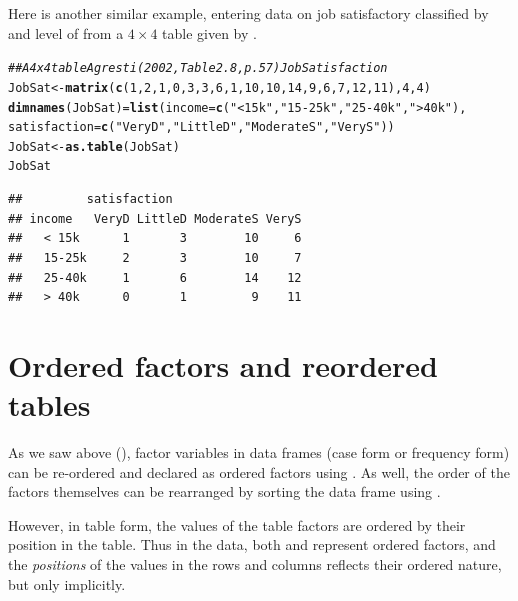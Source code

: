 \documentclass[11pt]{book}\usepackage[]{graphicx}\usepackage[]{color}
\makeatletter
\newcommand{\hlnum}[1]{\textcolor[rgb]{0.686,0.059,0.569}{#1}}%
\newcommand{\hlstr}[1]{\textcolor[rgb]{0.192,0.494,0.8}{#1}}%
\newcommand{\hlcom}[1]{\textcolor[rgb]{0.678,0.584,0.686}{\textit{#1}}}%
\newcommand{\hlstd}[1]{\textcolor[rgb]{0.345,0.345,0.345}{#1}}%
\newcommand{\hlkwb}[1]{\textcolor[rgb]{0.69,0.353,0.396}{#1}}%
\newcommand{\hlkwc}[1]{\textcolor[rgb]{0.333,0.667,0.333}{#1}}%
\newcommand{\hlkwd}[1]{\textcolor[rgb]{0.737,0.353,0.396}{\textbf{#1}}}%
\newenvironment{kframe}{%
 \def\at@end@of@kframe{}%
 \ifinner\ifhmode%
  \def\at@end@of@kframe{\end{minipage}}%
  \begin{minipage}{\columnwidth}%
 \fi\fi%
 \def\FrameCommand##1{\hskip\@totalleftmargin \hskip-\fboxsep
 \colorbox{shadecolor}{##1}\hskip-\fboxsep
     \hskip-\linewidth \hskip-\@totalleftmargin \hskip\columnwidth}%
 \MakeFramed {\advance\hsize-\width
   \@totalleftmargin\z@ \linewidth\hsize
   \@setminipage}}%
 {\par\unskip\endMakeFramed%
 \at@end@of@kframe}
\newenvironment{knitrout}{}{} %
\renewenvironment{knitrout}{\small\renewcommand{\baselinestretch}{.85}}{} %
\makeatother
\begin{document}
Here is another similar example, entering data on job satisfactory
classified by  and level of 
from a $4 \times 4$ table given by \citet[Table 2.8, p. 57]{Agresti:2002}.
\begin{knitrout}
\color{fgcolor}\begin{kframe}
\begin{alltt}
\hlcom{## A 4 x 4 table  Agresti (2002, Table 2.8, p. 57) Job Satisfaction}
\hlstd{JobSat} \hlkwb{<-} \hlkwd{matrix}\hlstd{(}\hlkwd{c}\hlstd{(}\hlnum{1}\hlstd{,}\hlnum{2}\hlstd{,}\hlnum{1}\hlstd{,}\hlnum{0}\hlstd{,} \hlnum{3}\hlstd{,}\hlnum{3}\hlstd{,}\hlnum{6}\hlstd{,}\hlnum{1}\hlstd{,} \hlnum{10}\hlstd{,}\hlnum{10}\hlstd{,}\hlnum{14}\hlstd{,}\hlnum{9}\hlstd{,} \hlnum{6}\hlstd{,}\hlnum{7}\hlstd{,}\hlnum{12}\hlstd{,}\hlnum{11}\hlstd{),} \hlnum{4}\hlstd{,} \hlnum{4}\hlstd{)}
\hlkwd{dimnames}\hlstd{(JobSat)} \hlkwb{=} \hlkwd{list}\hlstd{(}\hlkwc{income}\hlstd{=}\hlkwd{c}\hlstd{(}\hlstr{"< 15k"}\hlstd{,} \hlstr{"15-25k"}\hlstd{,} \hlstr{"25-40k"}\hlstd{,} \hlstr{"> 40k"}\hlstd{),}
                \hlkwc{satisfaction}\hlstd{=}\hlkwd{c}\hlstd{(}\hlstr{"VeryD"}\hlstd{,} \hlstr{"LittleD"}\hlstd{,} \hlstr{"ModerateS"}\hlstd{,} \hlstr{"VeryS"}\hlstd{))}
\hlstd{JobSat} \hlkwb{<-} \hlkwd{as.table}\hlstd{(JobSat)}
\hlstd{JobSat}
\end{alltt}
\begin{verbatim}
##         satisfaction
## income   VeryD LittleD ModerateS VeryS
##   < 15k      1       3        10     6
##   15-25k     2       3        10     7
##   25-40k     1       6        14    12
##   > 40k      0       1         9    11
\end{verbatim}
\end{kframe}
\end{knitrout}



\section{Ordered factors and reordered tables}\label{sec:ordered}
As we saw above (), factor variables in 
data frames (case form or frequency form)
can be re-ordered and declared as ordered factors using .
As well, the order of the factors themselves can be rearranged by
sorting the data frame using .

However, in table form, the values of the table factors are ordered by their position in the table.
Thus in the  data, both  and  represent ordered
factors, and the \emph{positions} of the values in the rows and columns reflects their
ordered nature, but only implicitly.
\end{document}
